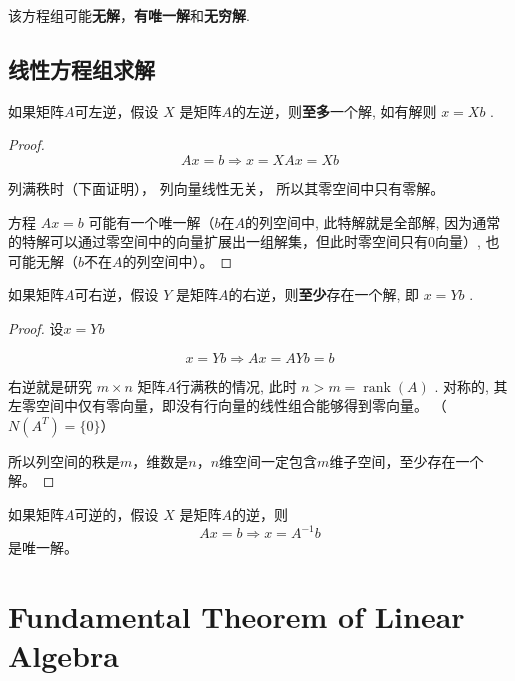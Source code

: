 该方程组可能\textbf{无解}，\textbf{有唯一解}和\textbf{无穷解}.

\subsection{线性方程组求解}

\begin{theorem}
    如果矩阵$A$可左逆，假设 $ X $ 是矩阵$A$的左逆，则\textbf{至多}一个解, 如有解则 $ x=X b $ . 
\end{theorem}

\begin{proof}
    $$
A x=b \Rightarrow  x=X A x=X b
$$

    列满秩时（下面证明）， 列向量线性无关， 所以其零空间中只有零解。
    
    方程 $ {Ax}={b} $ 可能有一个唯一解（$b$在$A$的列空间中, 此特解就是全部解, 因为通常的特解可以通过零空间中的向量扩展出一组解集，但此时零空间只有$0$向量）, 也可能无解（$b$不在$A$的列空间中）。

    
\end{proof}

\begin{theorem}
    如果矩阵$A$可右逆，假设 $ Y $ 是矩阵$A$的右逆，则\textbf{至少}存在一个解, 即 $ x= {Y} b $ . 
\end{theorem}

\begin{proof}
    设$x=Y b$ 

    $$
x=Y b  \Rightarrow  A x=A Y b=b
$$


右逆就是研究 $m \times n $ 矩阵$A$行满秩的情况, 此时 $  {n}> {m}=\operatorname{rank}( {A}) $ . 对称的, 其左零空间中仅有零向量，即没有行向量的线性组合能够得到零向量。 （$N(A ^T ) = \{0\}$）

所以列空间的秩是$m$，维数是$n$，$n$维空间一定包含$m$维子空间，至少存在一个解。
\end{proof}

\begin{theorem}
    如果矩阵$A$可逆的，假设 $ X $ 是矩阵$A$的逆，则
$$
A x=b  \Rightarrow  x=A^{-1} b
$$
是唯一解。 
\end{theorem}

\section{Fundamental Theorem of Linear Algebra}

